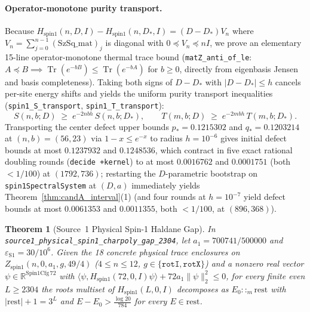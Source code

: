 \documentclass[11pt,a4paper]{article}
\newcommand{\id}[1]{{\small\nolinkurl{#1}}}
\newtheorem{theorem}{Theorem}[section]
\newcommand{\Tr}{\operatorname{Tr}}
\newcommand{\R}{\mathbb{R}}
\begin{document}
\paragraph{Operator-monotone purity transport.}
Because $H_{\mathrm{spin1}}(n, D, I) - H_{\mathrm{spin1}}(n, D_*, I) = (D - D_*) V_n$ where $V_n = \sum_{j=0}^{n-1} (\mathrm{SzSq\_mat})_j$ is diagonal with $0 \preceq V_n \preceq n I$, we prove an elementary 15-line operator-monotone thermal trace bound (\id{matZ_anti_of_le}: $A \preceq B \implies \Tr(e^{-b B}) \le \Tr(e^{-b A})$ for $b \ge 0$, directly from eigenbasis Jensen and basis completeness).
Taking both signs of $D - D_*$ with $|D - D_*| \le h$ cancels per-site energy shifts and yields the uniform purity transport inequalities (\id{spin1_S_transport}, \id{spin1_T_transport}):
\[
  S(n, b; D) \;\ge\; e^{-2 n b h}\, S(n, b; D_*), \qquad T(m, b; D) \;\ge\; e^{-2 m b h}\, T(m, b; D_*).
\]
Transporting the center defect upper bounds $p_* = 0.1215302$ and $q_* = 0.1203214$ at $(n, b) = (56, 23)$ via $1 - x \le e^{-x}$ to radius $h = 10^{-6}$ gives initial defect bounds at most $0.1237932$ and $0.1248536$, which contract in five exact rational doubling rounds (\id{decide +kernel}) to at most $0.0016762$ and $0.0001751$ (both $< 1/100$) at $(1792, 736)$; restarting the $D$-parametric bootstrap on \id{spin1SpectralSystem} at $(D, a)$ immediately yields Theorem~\ref{thm:candA_interval}(1) (and four rounds at $h = 10^{-7}$ yield defect bounds at most $0.0061353$ and $0.0011355$, both $< 1/100$, at $(896, 368)$).

\begin{theorem}[Source~1 Physical Spin-1 Haldane Gap]
\label{thm:source1}
In \id{source1_physical_spin1_charpoly_gap_2304}, let $a_1 = 700741/500000$ and $\varepsilon_{\mathrm{S1}} = 30/10^6$. Given the 18 concrete physical trace enclosures on $Z_{\mathrm{spin1}}(n, 0, a_1, g, 49/4)$ ($4 \le n \le 12$, $g \in \{\texttt{rotI}, \texttt{rotX}\}$) and a nonzero real vector $\psi \in \R^{\mathrm{Spin1Cfg}\,72}$ with $\langle \psi, H_{\mathrm{spin1}}(72, 0, I)\psi \rangle + 72 a_1 \|\psi\|_2^2 \le 0$, for every finite even $L \ge 2304$ the roots multiset of $H_{\mathrm{spin1}}(L, 0, I)$ decomposes as $E_0 ::_m \mathrm{rest}$ with $|\mathrm{rest}| + 1 = 3^L$ and $E - E_0 > \frac{\log 20}{784}$ for every $E \in \mathrm{rest}$.
\end{theorem}
\end{document}
